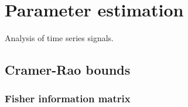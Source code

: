 \chapter{Parameter estimation}

Analysis of time series signals.

\section{Cramer-Rao bounds}

\subsection{Fisher information matrix}

